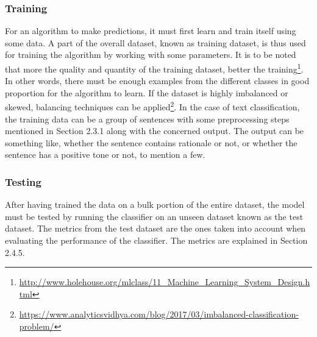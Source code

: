 \documentclass[a4paper,12pt,twoside]{report}
\begin{document}
\subsubsection{Training} 
For an algorithm to make predictions, it must first learn and train itself using some data. A part of the overall dataset, known as training dataset, is thus used for training the algorithm by working with some parameters. It is to be noted that more the quality and quantity of the training dataset, better the training\footnote{\url{http://www.holehouse.org/mlclass/11_Machine_Learning_System_Design.html}}. In other words, there must be enough examples from the different classes in good proportion for the algorithm to learn.  If the dataset is highly imbalanced or skewed, balancing techniques can be applied\footnote{\url{https://www.analyticsvidhya.com/blog/2017/03/imbalanced-classification-problem/}}. In the case of text classification, the training data can be a group of sentences with some preprocessing steps mentioned in Section 2.3.1 along with the concerned output. The output can be something like, whether the sentence contains rationale or not, or whether the sentence has a positive tone or not, to mention a few.

\subsubsection{Testing} 
After having trained the data on a bulk portion of the entire dataset, the model must be tested by running the classifier on an unseen dataset known as the test dataset. The metrics from the test dataset are the ones taken into account when evaluating the performance of the classifier. The metrics are explained in Section 2.4.5. 
\end{document}
